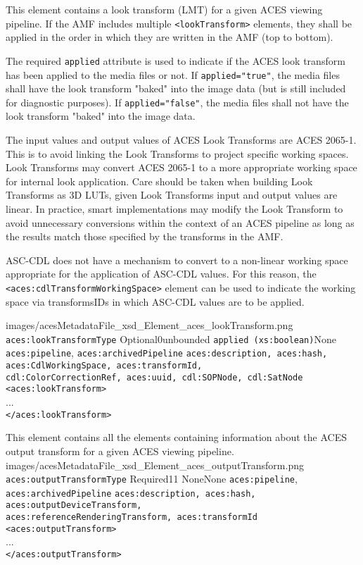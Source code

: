         {This element contains a look transform (LMT) for a given ACES viewing pipeline.  If the AMF includes multiple \texttt{<lookTransform>} elements, they shall be applied in the order in which they are written in the AMF (top to bottom).

        The required \texttt{applied} attribute is used to indicate if the ACES look transform has been applied to the media files or not.  If \texttt{applied="true"}, the media files shall have the look transform "baked" into the image data (but is still included for diagnostic purposes). If \texttt{applied="false"}, the media files shall not have the look transform "baked" into the image data. 
        
        The input values and output values of ACES Look Transforms are ACES 2065-1. This is to avoid linking the Look Transforms to project specific working spaces. Look Transforms may convert ACES 2065-1 to a more appropriate working space for internal look application. Care should be taken when building Look Transforms as 3D LUTs, given Look Transforms input and output values are linear. In practice, smart implementations may modify the Look Transform to avoid unnecessary conversions within the context of an ACES pipeline as long as the results match those specified by the transforms in the AMF.  

        ASC-CDL does not have a mechanism to convert to a non-linear working space appropriate for the application of ASC-CDL values. For this reason, the \texttt{<aces:cdlTransformWorkingSpace>} element can be used to indicate the working space via transformsIDs in which ASC-CDL values are to be applied.}
        {images/acesMetadataFile_xsd_Element_aces_lookTransform.png}
        {\texttt{aces:lookTransformType}}
        {Optional}{0}{unbounded}
        {\texttt{applied (xs:boolean)}}{None}
        {\texttt{aces:pipeline}, \texttt{aces:archivedPipeline}}
        {\texttt{aces:description, aces:hash, aces:CdlWorkingSpace, aces:transformId,\\  cdl:ColorCorrectionRef, aces:uuid, cdl:SOPNode, cdl:SatNode}}
        {\lstinline{<aces:lookTransform>} \\
        ... \\
        \lstinline{</aces:lookTransform>}} 

        {This element contains all the elements containing information about the ACES output transform for a given ACES viewing pipeline.}
        {images/acesMetadataFile_xsd_Element_aces_outputTransform.png}
        {\texttt{aces:outputTransformType}}
        {Required}{1}{1}
        {None}{None}
        {\texttt{aces:pipeline}, \texttt{aces:archivedPipeline}}
        {\texttt{aces:description, aces:hash, aces:outputDeviceTransform, \\
        aces:referenceRenderingTransform, aces:transformId}}
        {\lstinline{<aces:outputTransform>} \\
        ... \\
        \lstinline{</aces:outputTransform>}} 

